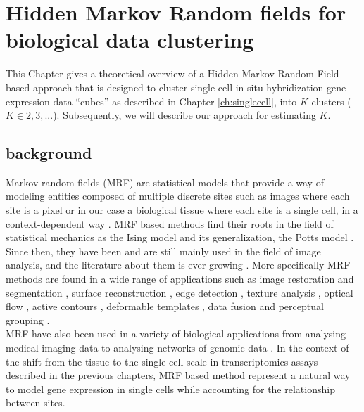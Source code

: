 \chapter{Hidden Markov Random fields for biological data clustering}\label{ch:HMRF} 
This Chapter gives a theoretical overview of a Hidden Markov Random Field based approach that is designed to cluster single cell in-situ hybridization gene expression data ``cubes'' as described in Chapter \ref{ch:singlecell}, into $K$ clusters ($K \in {2, 3,...}$). Subsequently, we will describe our approach for estimating $K$.

	\section{background}
	Markov random fields (MRF) are statistical models that provide a way of modeling entities composed of multiple discrete sites such as images where each site is a pixel or in our case a biological tissue where each site is a single cell, in a context-dependent way \citep{li09}. MRF based methods find their roots in the field of statistical mechanics as the Ising model \citep{Ising25} and its generalization, the Potts model \citep{Wu82}. Since then, they have been and are still mainly used in the field of image analysis, and the literature about them is ever growing \citep{rozanov82,li95}. More specifically MRF methods are found in a wide range of applications such as image restoration and segmentation \citep{zhang01}, surface reconstruction \citep{paulsen10}, edge detection \citep{zerubia93}, texture analysis \citep{clausi04}, optical flow \citep{heitz93}, active contours \citep{martin05}, deformable templates \citep{mignotte01}, data fusion \citep{wright89} and perceptual grouping \citep{fields97}.\\
	
	MRF have also been used in a variety of biological applications from analysing medical imaging data \citep{zhang01,held97,descombes98} to analysing networks of genomic data \citep{wei07}. In the context of the shift from the tissue to the single cell scale in transcriptomics assays described in the previous chapters, MRF based method represent a natural way to model gene expression in single cells while accounting for the relationship between sites.\\
	
